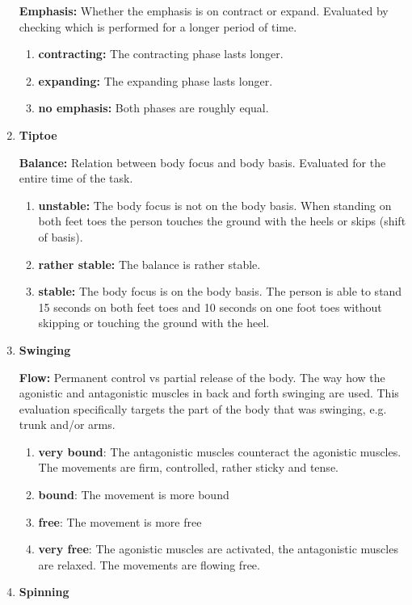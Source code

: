 \documentclass[extern,palatino]{cgMA}
\begin{document}
\begin{enumerate}[I]
    \textbf{Emphasis:} Whether the emphasis is on contract or expand. Evaluated by checking which is performed for a longer period of time. 
    \begin{enumerate}
        \item \textbf{contracting:} The contracting phase lasts longer.
        \item \textbf{expanding:} The expanding phase lasts longer.
        \item \textbf{no emphasis:} Both phases are roughly equal.
    \end{enumerate}
\item \textbf{Tiptoe}
    
    \textbf{Balance:} Relation between body focus and body basis. Evaluated for the entire time of the task. 
    \begin{enumerate}
        \item \textbf{unstable:} The body focus is not on the body basis. When standing on both feet toes the person touches the ground with the heels or skips (shift of basis).
        \item \textbf{rather stable:} The balance is rather stable.
        \item \textbf{stable:} The body focus is on the body basis. The person is able to stand 15 seconds on both feet toes and 10 seconds on one foot toes without skipping or touching the ground with the heel.
    \end{enumerate}
\item \textbf{Swinging}
    
    \textbf{Flow:} Permanent control vs partial release of the body. The way how the agonistic and antagonistic muscles in back and forth swinging are used. This evaluation specifically targets the part of the body that was swinging, e.g. trunk and/or arms.
    \begin{enumerate}
        \item \textbf{very bound}: The antagonistic muscles counteract the agonistic muscles. The movements are firm, controlled, rather sticky and tense.
        \item \textbf{bound}: The movement is more bound
        \item \textbf{free}: The movement is more free
        \item \textbf{very free}: The agonistic muscles are activated, the antagonistic muscles are relaxed. The movements are flowing free.
    \end{enumerate}
\item \textbf{Spinning}
    

\end{enumerate}
\end{document}
